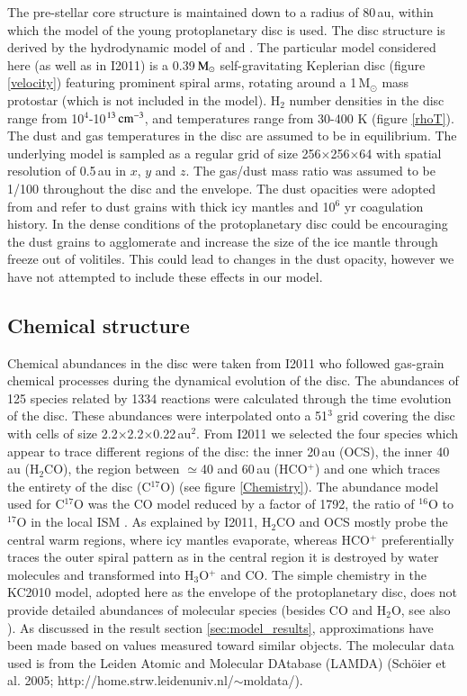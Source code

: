 \documentclass[useAMS,usenatbib]{mn2e}
\begin{document}
The pre-stellar core structure is maintained down to a radius of 80\,au, within which the model of the young protoplanetary disc is used. The disc structure is derived by the hydrodynamic model of \citet{Boley2007} and  \citet{Boley2009}. The particular model considered here (as well as in I2011) is a 0.39$\,\rm{M}_\odot$ self-gravitating Keplerian disc (figure \ref{velocity}) featuring prominent spiral arms, rotating around a 1$\,$M$_\odot$ mass protostar (which is not included in the model). H$_2$ number densities in the disc range from 10$^{4}$-10$^{13}\,\rm{cm}^{-3}$, and temperatures range from 30-400 K (figure \ref{rhoT}). The dust and gas temperatures in the disc are assumed to be in equilibrium. The underlying model is sampled as a regular grid of size 256$\times$256$\times$64 with spatial resolution of 0.5$\,$au in $x$, $y$ and $z$. The gas/dust mass ratio was assumed to be 1/100 throughout the disc and the envelope. The dust opacities were adopted from \citet{Ossenkopf1994} and refer to dust grains with thick icy mantles and 10$^6$ yr coagulation history. In the dense conditions of the protoplanetary disc could be encouraging the dust grains to agglomerate and increase the size of the ice mantle through freeze out of volitiles. This could lead to changes in the dust opacity, however we have not attempted to include these effects in our model.\smallskip

\subsection{Chemical structure} \label{subsec:chemical_structure}
Chemical abundances in the disc were taken from I2011 who followed gas-grain chemical processes during the dynamical evolution of the disc. The abundances of 125 species related by 1334 reactions were calculated through the time evolution of the disc. These abundances were interpolated onto a 51$^3$ grid covering the disc with cells of size 2.2$\times$2.2$\times$0.22$\,$au$^2$.  From I2011 we selected the four species which appear to trace different regions of the disc: the inner 20\,au (OCS), the inner 40\,au (H$_2$CO),  the region between $\simeq$40 and 60\,au (HCO$^+$) and one which traces the entirety of the disc (C$^{17}$O) (see figure \ref{Chemistry}). The abundance model used for C$^{17}$O was the CO model reduced by a factor of 1792, the ratio of $^{16}$O to $^{17}$O in the local ISM \citep{Wilson1994}. As explained by I2011,  H$_2$CO and OCS mostly probe the central warm regions, where icy mantles evaporate, whereas HCO$^+$ preferentially traces the outer spiral pattern as in the central region it is destroyed by water molecules and transformed into H$_3$O$^+$ and CO. The simple chemistry in the KC2010 model, adopted here as the envelope of the protoplanetary disc, does not provide detailed abundances of molecular species (besides CO and H$_2$O, see also \cite{Caselli2012}). As discussed in the result section \ref{sec:model_results}, approximations have been made based on values measured toward similar objects. The molecular data used is from the Leiden Atomic and Molecular DAtabase (LAMDA) (Sch\"oier et al. 2005; http://home.strw.leidenuniv.nl/$\sim$moldata/).
\end{document}
